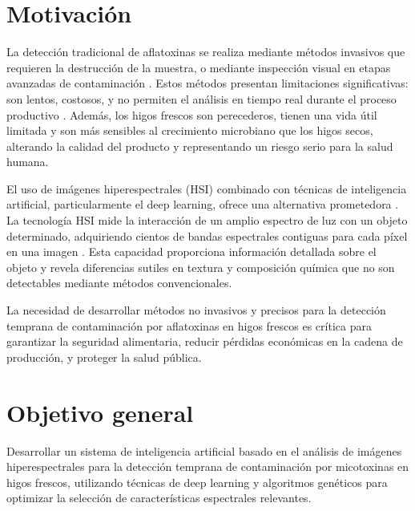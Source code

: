 \section{Motivación}
La detección tradicional de aflatoxinas se realiza mediante métodos invasivos que requieren la destrucción de la muestra, o mediante inspección visual en etapas avanzadas de contaminación \cite{russell2016artificial,geron2019hands}. Estos métodos presentan limitaciones significativas: son lentos, costosos, y no permiten el análisis en tiempo real durante el proceso productivo \cite{burkov2020machine}. Además, los higos frescos son perecederos, tienen una vida útil limitada y son más sensibles al crecimiento microbiano que los higos secos, alterando la calidad del producto y representando un riesgo serio para la salud humana.

El uso de imágenes hiperespectrales (HSI) combinado con técnicas de inteligencia artificial, particularmente el deep learning, ofrece una alternativa prometedora \cite{goodfellow2016deep,lecun2015deep}. La tecnología HSI mide la interacción de un amplio espectro de luz con un objeto determinado, adquiriendo cientos de bandas espectrales contiguas para cada píxel en una imagen \cite{lu2020medical,zhang2016hyperspectral}. Esta capacidad proporciona información detallada sobre el objeto y revela diferencias sutiles en textura y composición química que no son detectables mediante métodos convencionales.

La necesidad de desarrollar métodos no invasivos y precisos para la detección temprana de contaminación por aflatoxinas en higos frescos es crítica para garantizar la seguridad alimentaria, reducir pérdidas económicas en la cadena de producción, y proteger la salud pública.

\section{Objetivo general}
Desarrollar un sistema de inteligencia artificial basado en el análisis de imágenes hiperespectrales para la detección temprana de contaminación por micotoxinas en higos frescos, utilizando técnicas de deep learning y algoritmos genéticos para optimizar la selección de características espectrales relevantes.

